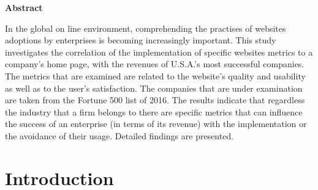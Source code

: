 \documentclass{book}
\begin{document}
\newpage
\begin{center}
\textbf{Abstract}
\end{center}
In the global on line environment, comprehending the practises of websites adoptions by enterprises is becoming increasingly important. This study investigates the correlation of the implementation of specific websites metrics to a company's home page, with the revenues of U.S.A.'s most successful companies. The metrics that are examined are related to the website's quality and usability as well as to the user's satisfaction. The companies that are under examination are taken from the Fortune 500 list of 2016. The results indicate that regardless the industry that a firm belongs to there are specific metrics that can influence the success of an enterprise (in terms of its revenue) with the implementation or the avoidance of their usage. Detailed findings are presented.
\newpage
\tableofcontents
\newpage
\chapter{Introduction}
\end{document}
